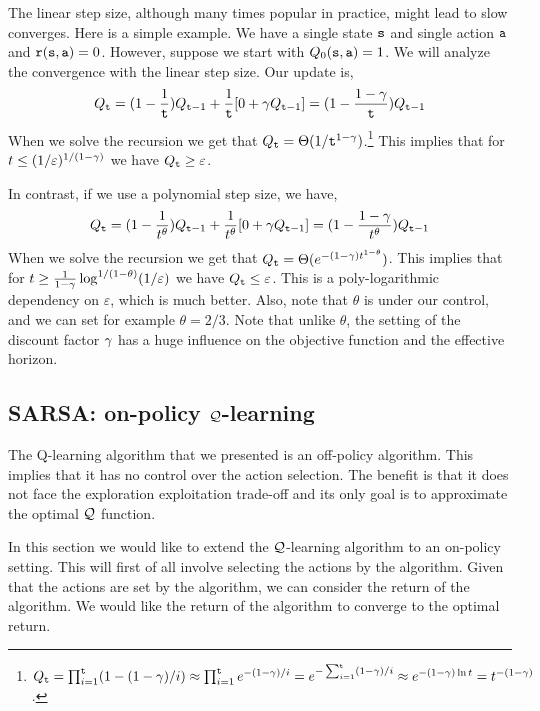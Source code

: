 The linear step size, although many times popular in practice, might
lead to slow converges. Here is a simple example. We have a single
state ${\tt s}$ and single action ${\tt a}$ and
${\tt r}({\tt s},{\tt a})=0$. However, suppose we start with
$Q_0({\tt s},{\tt a})=1$. We will analyze the convergence with the
linear step size. Our update is,
\[
Q_{\tt t} =
(1-\frac{1}{{\tt t}})Q_{{\tt t}-1}+\frac{1}{{\tt t}}[0+\gamma
Q_{{\tt t}-1}]=(1-\frac{1-\gamma}{{\tt t}})Q_{{\tt t}-1}
\]
When we solve the recursion we get that
$Q_{\tt t}=\Theta(1/{\tt t}^{1-\gamma})$.\footnote{$Q_{\tt t}=\prod_{i=1}^{\tt t} (1-(1-\gamma)/i)\approx
\prod_{i=1}^{\tt t} e^{-(1-\gamma)/i}=e^{-\sum_{i=1}^{\tt t}
(1-\gamma)/i }\approx e^{-(1-\gamma)\ln
t}=t^{-(1-\gamma)}$. }
%
This implies that for $t\leq  (1/\varepsilon)^{1/(1-\gamma)}$ we
have $Q_{\tt t} \geq \varepsilon$.

In contrast, if we use a polynomial step size, we have,
\[
Q_{\tt t} =
(1-\frac{1}{t^\theta})Q_{{\tt t}-1}+\frac{1}{t^\theta}[0+\gamma
Q_{{\tt t}-1}]=(1-\frac{1-\gamma}{t^\theta})Q_{{\tt t}-1}
\]
When we solve the recursion we get that
$Q_{\tt t}=\Theta(e^{-(1-\gamma)t^{1-\theta}})$. This implies that
for $t\geq \frac{1}{1-\gamma}\log^{1/(1-\theta)} (1/\varepsilon)$
we have $Q_{\tt t} \leq \varepsilon$. This is a poly-logarithmic
dependency on $\varepsilon$, which is much better. Also, note that
$\theta$ is under our control, and we can set for example
$\theta=2/3$. Note that unlike $\theta$, the setting of the discount
factor $\gamma$ has a huge influence on the objective function
and the effective horizon.

\subsection{SARSA: on-policy $\mathcal{Q}$-learning}

The Q-learning algorithm that we presented is an off-policy
algorithm. This implies that it has no control over the action
selection. The benefit is that it does not face the exploration
exploitation trade-off and its only goal is to approximate the
optimal $\mathcal{Q}$ function.

In this section we would like to extend the $\mathcal{Q}$-learning algorithm
to an on-policy setting. This will first of all involve selecting
the actions by the algorithm. Given that the actions are set by the
algorithm, we can consider the return of the algorithm. We would
like the return of the algorithm to converge to the optimal return.



